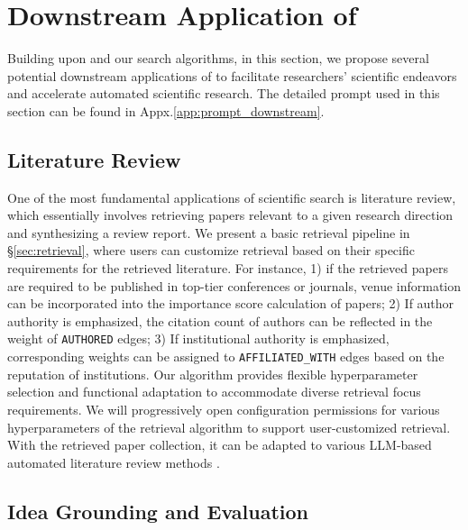 \section{Downstream Application of {\ours}}
\label{sec:application}
Building upon {\ours} and our search algorithms, in this section, we propose several potential downstream applications of {\ours} to facilitate researchers' scientific endeavors and accelerate automated scientific research. The detailed prompt used in this section can be found in Appx.\ref{app:prompt_downstream}.

\subsection{Literature Review}
One of the most fundamental applications of scientific search is literature review, which essentially involves retrieving papers relevant to a given research direction and synthesizing a review report.
We present a basic retrieval pipeline in \S\ref{sec:retrieval}, where users can customize retrieval based on their specific requirements for the retrieved literature.
For instance, 1) if the retrieved papers are required to be published in top-tier conferences or journals, venue information can be incorporated into the importance score calculation of papers;
2) If author authority is emphasized, the citation count of authors can be reflected in the weight of \texttt{AUTHORED} edges;
3) If institutional authority is emphasized, corresponding weights can be assigned to \texttt{AFFILIATED\_WITH} edges based on the reputation of institutions.
Our algorithm provides flexible hyperparameter selection and functional adaptation to accommodate diverse retrieval focus requirements.
We will progressively open configuration permissions for various hyperparameters of the retrieval algorithm to support user-customized retrieval.
With the retrieved paper collection, it can be adapted to various LLM-based automated literature review methods \citep{autosurvey,deepreview,surveyforge,surveyx}.

\subsection{Idea Grounding and Evaluation}

